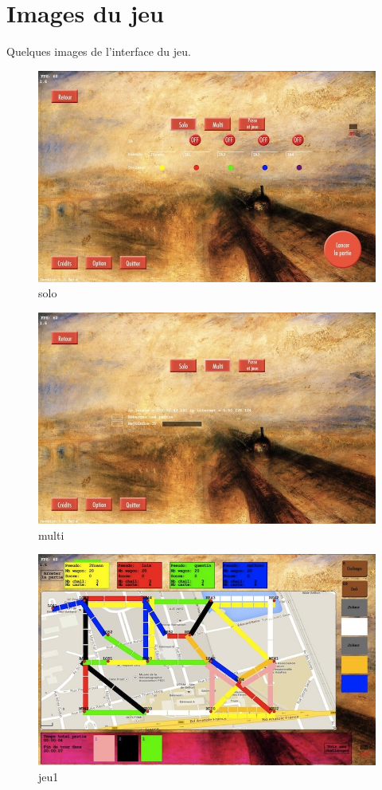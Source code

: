 \documentclass{report}
\begin{document}
\chapter{Images du jeu}
Quelques images de l'interface du jeu.
\begin{figure}[H]
\center
\includegraphics[width=500pt]{solo.jpg}
\caption{solo}
\label{solo}
\end{figure}
\begin{figure}[H]
\center
\includegraphics[width=500pt]{multi.jpg}
\caption{multi}
\label{multi}
\end{figure}
\begin{figure}[H]
\center
\includegraphics[width=450pt]{jeu1.jpg}
\caption{jeu1}
\label{jeu1}
\end{figure}
\end{document}
